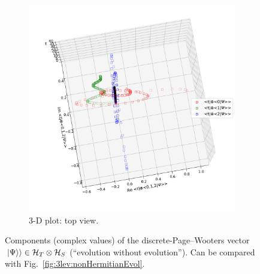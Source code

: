 \begin{figure}[]
\begin{subfigure}[b]{\textwidth}
    \includegraphics[height=0.48\textheight,clip,trim= 0 60 0 100]{img/3ldetect/PWSpaceTime_top.pdf}
    \caption{3-D plot: top view.}
  \end{subfigure}
  \caption{
    Components (complex values) of the discrete-Page--Wooters vector
    $\left.\left| \Psi \right\rangle\right\rangle \in \mathcal{H}_T \otimes \mathcal{H}_S$
    (``evolution without evolution'').
    Can be compared with Fig.~\ref{fig:3lev:nonHermitianEvol}.
  }
  \label{fig:3lev:PWSpaceTime}
\end{figure}

